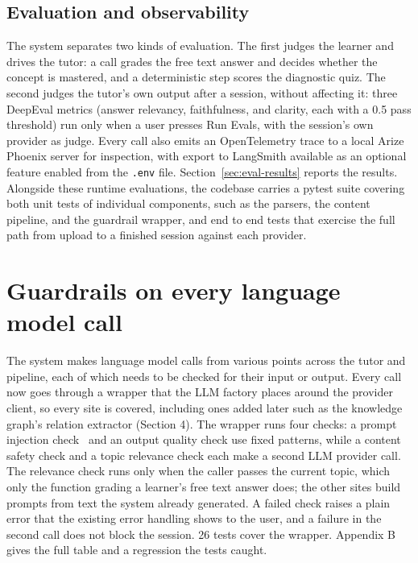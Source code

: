 \documentclass{ecai}
\begin{document}
\subsection{Evaluation and observability}

The system separates two kinds of evaluation. The first judges the learner and
drives the tutor: a call grades the free text answer and decides whether the
concept is mastered, and a deterministic step scores the diagnostic quiz. The
second judges the tutor's own output after a session, without affecting it: three
DeepEval metrics (answer relevancy, faithfulness, and clarity, each with a 0.5
pass threshold) run only when a user presses Run Evals, with the session's own
provider as judge. Every call also emits an OpenTelemetry trace to a local Arize
Phoenix server for inspection, with export to LangSmith available as an optional
feature enabled from the \texttt{.env} file. Section~\ref{sec:eval-results}
reports the results. Alongside these
runtime evaluations, the codebase carries a pytest suite covering both unit tests
of individual components, such as the parsers, the content pipeline, and the
guardrail wrapper, and end to end tests that exercise the full path from upload
to a finished session against each provider.

\section{Guardrails on every language model call}

The system makes language model calls from various points across the tutor and
pipeline, each of which needs to be checked for their input or output. Every call now goes
through a wrapper that the LLM factory places around the provider client, so
every site is covered, including ones added later such as the knowledge graph's
relation extractor (Section 4). The wrapper runs four checks: a prompt injection
check~\cite{greshake2023not} and an output quality check use fixed patterns,
while a content safety check and a topic relevance check each make a second LLM
provider call. The relevance check runs only when the caller passes the current
topic, which only the function grading a learner's free text answer does; the
other sites build prompts from text the system already generated. A failed check
raises a plain error that the existing error handling shows to the user, and a
failure in the second call does not block the session. 26 tests cover the
wrapper. Appendix B gives the full table and a regression the tests caught.
\end{document}
